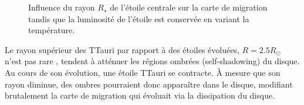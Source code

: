 \begin{figure}[htbp]
\centering
{}
\hfill
{}

\hfill
{}
\caption{Influence du rayon $R_\star$ de l'étoile centrale sur la carte de migration tandis que la luminosité de l'étoile est
conservée en variant la température. }\label{fig:map_TTauri_radius}
\end{figure}

Le rayon supérieur des TTauri par rapport à des étoiles évoluées, $R=2.5R_\odot$ n'est pas rare , tendent à atténuer les régions ombrées (\og self-shadowing\fg) du disque. Au cours de son évolution, une étoile TTauri se contracte. À mesure que son rayon diminue, des ombres pourraient donc apparaître dans le disque, modifiant brutalement la carte de migration qui évoluait via la dissipation du disque.


